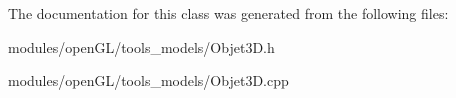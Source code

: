The documentation for this class was generated from the following files\-:\begin{DoxyCompactItemize}
\item 
modules/open\-G\-L/tools\-\_\-models/Objet3\-D.\-h\item 
modules/open\-G\-L/tools\-\_\-models/Objet3\-D.\-cpp\end{DoxyCompactItemize}
